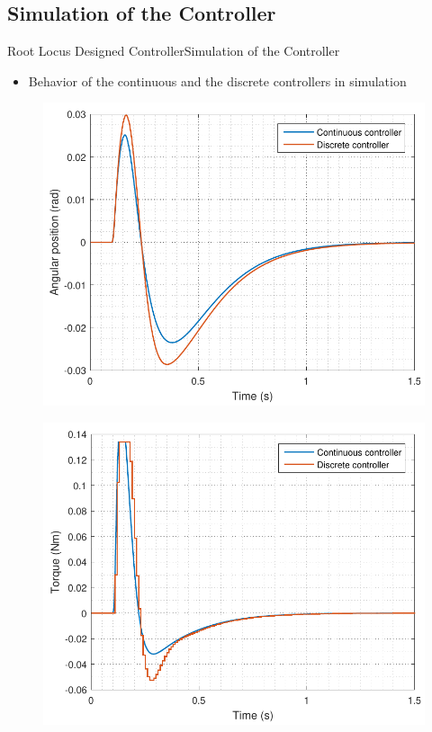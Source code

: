 \subsection{Simulation of the Controller}
\begin{frame}{Root Locus Designed Controller}{Simulation of the Controller}
\begin{itemize}
	\item Behavior of the continuous and the discrete controllers in simulation 
\end{itemize}
\begin{minipage}{\linewidth}
	\begin{minipage}{0.45\linewidth}
		\begin{figure}
			\includegraphics[scale=.37]{Pictures/positionRL}
			\centering
		\end{figure}
	\end{minipage}
	\hspace{0.05\linewidth}
	\begin{minipage}{0.45\linewidth}
		\begin{figure}[H]
			\includegraphics[scale=.37]{Pictures/torqueRL}

\end{figure}
\end{minipage}
\end{minipage}
\end{frame}
